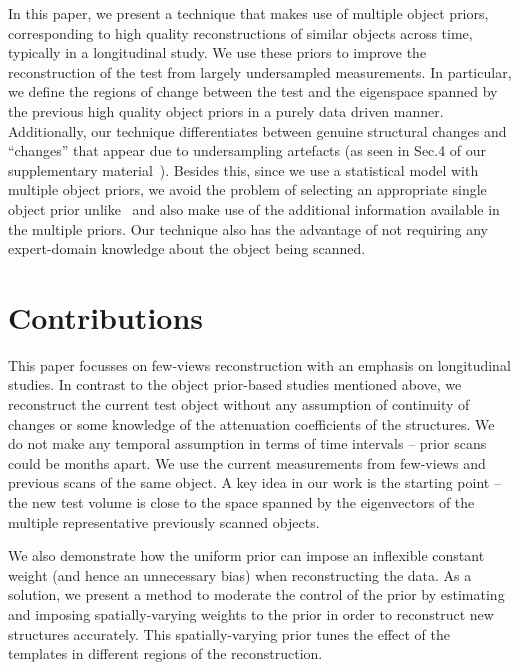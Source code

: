 \documentclass[journal]{IEEEtran}
\begin{document}
In this paper, we present a technique that makes use of multiple
object priors, corresponding to high quality reconstructions of
similar objects across time, typically in a longitudinal study.
We use these priors to improve the
reconstruction of the test from largely undersampled measurements. In
particular, we define the regions of change between the test and the
eigenspace spanned by the previous high quality object priors in a
purely data driven manner. Additionally, our technique differentiates
between genuine structural changes and ``changes'' that appear due to
undersampling artefacts (as seen in Sec.4 of our supplementary
material~\cite{supp_paper}).  Besides this, since we use a statistical
model with multiple object priors, we avoid the problem of selecting
an appropriate single object prior
unlike~\cite{PICCS,Pourmorteza2015,Lee2012,pirple,Marjolein2016} and
also make use of the additional information available in the multiple
priors. Our technique also has the advantage of not requiring any
expert-domain knowledge about the object being scanned.
 

\section{Contributions}
\label{sec:contributions}
This paper focusses on few-views reconstruction with an emphasis on
longitudinal studies. In contrast to
the object prior-based studies mentioned above, we
reconstruct the current test object without any assumption of
continuity of changes or some knowledge of the attenuation
coefficients of the structures. We do not make any temporal assumption
in terms of time intervals -- prior scans could be months apart. We
use the current measurements from few-views and previous scans of the
same object. A key idea in our work is the starting point -- the new
test volume is close to the space spanned by the eigenvectors of the
multiple representative previously scanned objects.


We also demonstrate how the uniform prior can impose an inflexible
constant weight (and hence an unnecessary bias) when reconstructing
the data. As a solution, we present a method to moderate the control
of the prior by estimating and imposing spatially-varying weights to
the prior in order to reconstruct new structures accurately. This
spatially-varying prior tunes the effect of the templates in different
regions of the reconstruction.
\end{document}
